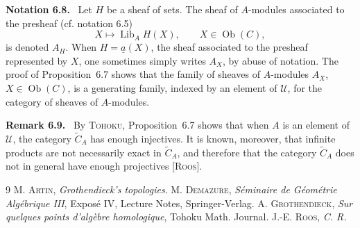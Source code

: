 \documentclass[11pt]{article}
\newcommand{\U}{\mathcal{U}}
\newcommand{\Ob}{\operatorname{Ob}}
\newenvironment{remarktext}[1]{\par\medskip\noindent\textbf{#1.}\ }{\par\medskip}
\begin{document}
\begin{remarktext}{Notation 6.8}
Let \(H\) be a sheaf of sets. The sheaf of \(A\)-modules associated to the presheaf (cf. notation 6.5)
\[
X\longmapsto \operatorname{Lib}_A H(X),\qquad X\in\Ob(C),
\]
is denoted \(A_H\). When \(H=\underline a(X)\), the sheaf associated to the presheaf represented by \(X\), one sometimes simply writes \(A_X\), by abuse of notation. The proof of Proposition~6.7 shows that the family of sheaves of \(A\)-modules \(A_X\), \(X\in\Ob(C)\), is a generating family, indexed by an element of \(\U\), for the category of sheaves of \(A\)-modules.
\end{remarktext}

\begin{remarktext}{Remark 6.9}
By \textsc{Tohoku}, Proposition~6.7 shows that when \(A\) is an element of \(\U\), the category \(\widetilde C_A\) has enough injectives. It is known, moreover, that infinite products are not necessarily exact in \(\widetilde C_A\), and therefore that the category \(\widetilde C_A\) does not in general have enough projectives [\textsc{Roos}].
\end{remarktext}

\begin{thebibliography}{9}
 M. \textsc{Artin}, \emph{Grothendieck's topologies}.
 M. \textsc{Demazure}, \emph{S\'eminaire de G\'eom\'etrie Alg\'ebrique III}, Expos\'e IV, Lecture Notes, Springer-Verlag.
 A. \textsc{Grothendieck}, \emph{Sur quelques points d'alg\`ebre homologique}, Tohoku Math. Journal.
 J.-E. \textsc{Roos}, \emph{C. R.}
\end{thebibliography}
\end{document}
